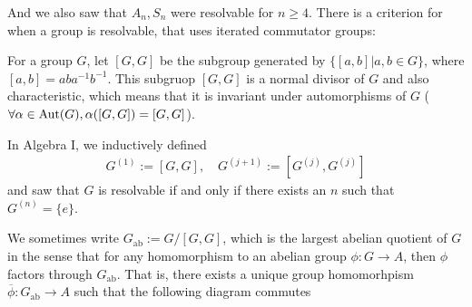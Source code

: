 And we also saw that $A_n,S_n$ were resolvable for $n \geq 4$.
There is a criterion for when a group is resolvable, that uses iterated commutator groups:

For a group $G$, let $[G,G]$ be the subgroup generated by $\{[a,b] \big\vert a,b \in G\}$, where $[a,b] = aba^{-1}b^{-1}$.
This subgruop $[G,G]$ is a normal divisor of $G$ and also characteristic, which means that it is invariant under automorphisms of $G$ ($\forall \alpha \in \operatorname{Aut}(G), \alpha([G,G]) = [G,G]$).

In Algebra I, we inductively defined
\begin{align*}
  G^{(1)} := [G,G], \quad G^{(j+1)} := [G^{(j)}, G^{(j)}]
\end{align*}
and saw that $G$ is resolvable if and only if there exists an $n$ such that $G^{(n)} = \{e\}$.

We sometimes write $G_{\text{ab}} := G/[G,G]$, which is the largest abelian quotient of $G$ in the sense that for any homomorphism to an abelian group $\phi: G \to  A$, then $\phi$ factors through $G_{\text{ab}}$.
That is, there exists a unique group homomorhpism $\overline{\phi}:G_{\text{ab}} \to A$ such that the following diagram commutes
\begin{center}
\end{center}



